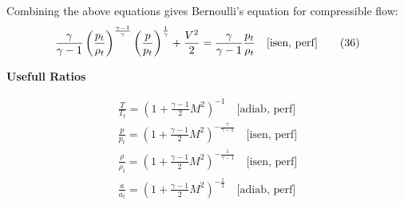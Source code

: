 \begin{multicols}{2}
Combining the above equations gives Bernoulli's equation for compressible flow:
\begin{equation}
\frac{\gamma}{\gamma - 1} \left(\frac{p_t}{\rho_t}\right)^{\frac{\gamma - 1}{\gamma}} \left(\frac{p}{p_t}\right)^{\frac{1}{\gamma}} + \frac{V^2}{2} = \frac{\gamma}{\gamma - 1} \frac{p_t}{\rho_t}
\\ \quad \text{[isen, perf]} \tag{36}
\end{equation}

\textbf{Usefull Ratios}

\begin{gather}
\frac{T}{T_t} = \left(1 + \frac{\gamma - 1}{2} M^2 \right)^{-1}
\quad \text{[adiab, perf]} \tag{43} \\
\frac{p}{p_t} = \left(1 + \frac{\gamma - 1}{2} M^2 \right)^{-\frac{\gamma}{\gamma - 1}}
\quad \text{[isen, perf]} \tag{44} \\
\frac{\rho}{\rho_t} = \left(1 + \frac{\gamma - 1}{2} M^2 \right)^{-\frac{1}{\gamma - 1}}
\quad \text{[isen, perf]} \tag{45} \\
\frac{a}{a_t} = \left(1 + \frac{\gamma - 1}{2} M^2 \right)^{-\frac{1}{2}}
\quad \text{[adiab, perf]} \tag{46}
\end{gather}

\end{multicols}
